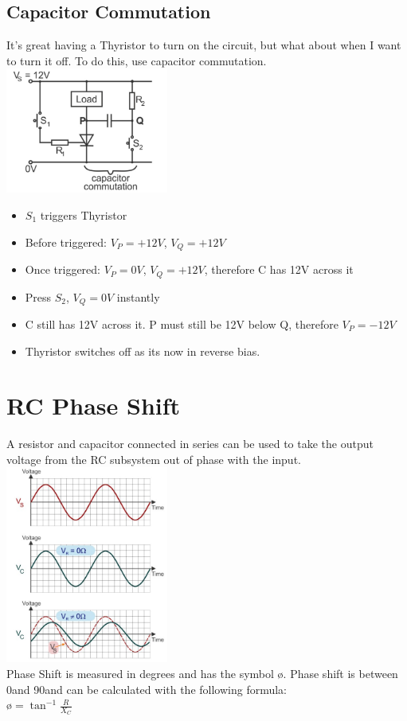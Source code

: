 \documentclass[a4paper, 11pt, twocolumn]{article}
\begin{document}
    \subsection{Capacitor Commutation}
    It's great having a Thyristor to turn on the circuit, but what about when I want to turn it off. To do this, use capacitor commutation.\\
    \includegraphics[width=0.4\textwidth]{capacitorCommutation.jpg}\\
    \begin{itemize}
        \item $S_1$ triggers Thyristor
        \item Before triggered: $V_P=+12V$, $V_Q=+12V$
        \item Once triggered: $V_P=0V$, $V_Q=+12V$, therefore C has 12V across it
        \item Press $S_2$, $V_Q=0V$ instantly
        \item C still has 12V across it. P must still be 12V below Q, therefore $V_P=-12V$
        \item Thyristor switches off as its now in reverse bias.
    \end{itemize}

    \section{RC Phase Shift}
    A resistor and capacitor connected in series can be used to take the output voltage from the RC subsystem out of phase with the input.\\
    \includegraphics[width=0.4\textwidth]{phaseShift.jpg}\\
    Phase Shift is measured in degrees and has the symbol \o. Phase shift is between 0\textdegree and 90\textdegree and can be calculated with the following formula:\\
    \o $\displaystyle = \tan^{-1}\frac{R}{X_C}$
\end{document}
